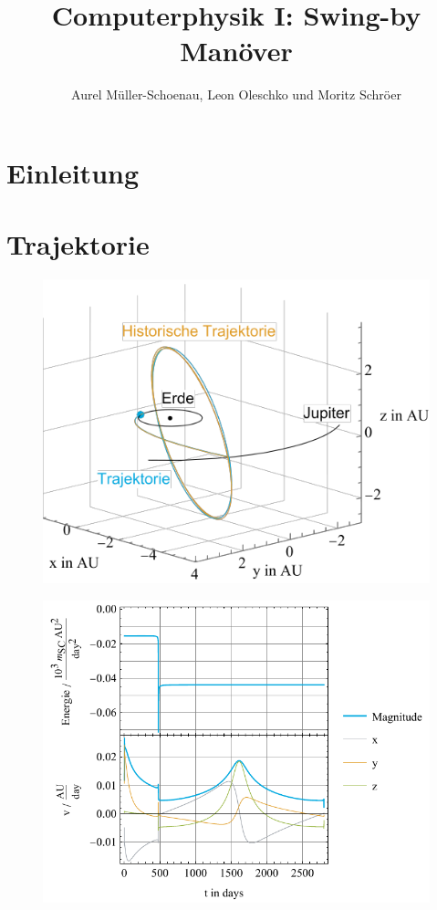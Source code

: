 





\title{Computerphysik I: Swing-by Manöver}
\author{Aurel Müller-Schoenau, Leon Oleschko und Moritz Schröer}
\maketitle

\begin{abstract}	
\end{abstract}

\section{Einleitung}

\section{Trajektorie}
\begin{figure}[h!]
	\centering
	\includegraphics{img/trajectory.pdf}
\end{figure}
\begin{figure}[h!]
	\centering
	\includegraphics{img/energy.pdf}
\end{figure}



